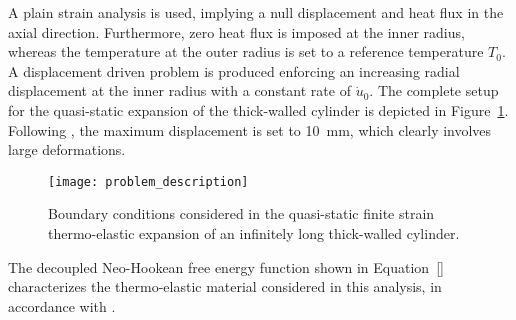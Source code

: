 A plain strain analysis is used, implying a null displacement and heat flux in the axial direction.
Furthermore, zero heat flux is imposed at the inner radius, whereas the temperature at the outer radius is set to a reference temperature \(T_{0}\).
A displacement driven problem is produced enforcing an increasing radial displacement at the inner radius with a constant rate of \(\dot{u}_{0}\).
The complete setup for the quasi-static expansion of the thick-walled cylinder is depicted in Figure~\ref{fig:problem_description}.
Following \cite{ibrahimbegovic_thermodynamics_2009}, the maximum displacement is set to \SI{10}{\milli\meter}, which clearly involves large deformations.

\begin{figure}[htbp]
  \centering
  \texttt{[image: problem\_description]}
  \caption{Boundary conditions considered in the quasi-static finite strain thermo-elastic expansion of an infinitely long thick-walled cylinder.}
\label{fig:problem_description}
\end{figure}

The decoupled Neo-Hookean free energy function shown in Equation~\ref{} characterizes the thermo-elastic material considered in this analysis, in accordance with \cite{armero_new_1992}.



